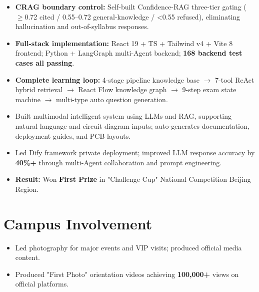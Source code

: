 \documentclass[10pt]{resume}
\begin{document}
\begin{itemize}[parsep=0.1ex, leftmargin=1.2pc]
  \item \textbf{CRAG boundary control:} Self-built Confidence-RAG three-tier gating ($\ge$0.72 cited / 0.55--0.72 general-knowledge / <0.55 refused), eliminating hallucination and out-of-syllabus responses.
  \item \textbf{Full-stack implementation:} React 19 + TS + Tailwind v4 + Vite 8 frontend; Python + LangGraph multi-Agent backend; \textbf{168 backend test cases all passing}.
  \item \textbf{Complete learning loop:} 4-stage pipeline knowledge base $\to$ 7-tool ReAct hybrid retrieval $\to$ React Flow knowledge graph $\to$ 9-step exam state machine $\to$ multi-type auto question generation.
\end{itemize}
\begin{itemize}[parsep=0.1ex, leftmargin=1.2pc]
  \item Built multimodal intelligent system using LLMs and RAG, supporting natural language and circuit diagram inputs; auto-generates documentation, deployment guides, and PCB layouts.
  \item Led Dify framework private deployment; improved LLM response accuracy by \textbf{40\%+} through multi-Agent collaboration and prompt engineering.
  \item \textbf{Result:} Won \textbf{First Prize} in "Challenge Cup" National Competition Beijing Region.
\end{itemize}

\section{Campus Involvement}
\begin{itemize}[parsep=0.1ex, leftmargin=1.2pc]
  \item Led photography for major events and VIP visits; produced official media content.
  \item Produced "First Photo" orientation videos achieving \textbf{100,000+} views on official platforms.
\end{itemize}
\end{document}
